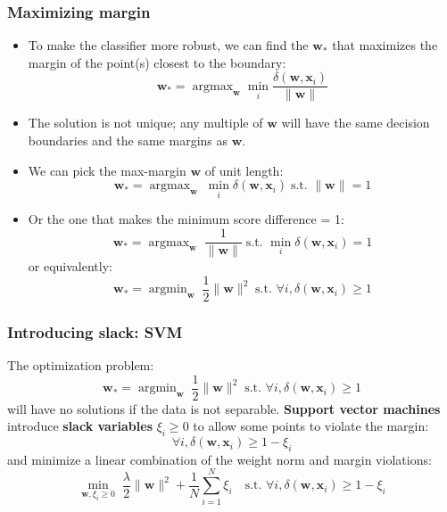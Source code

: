 \documentclass[ignorenonframetext,plain,fleqn]{beamer}
\DeclareMathOperator*{\argmax}{argmax}
\DeclareMathOperator*{\argmin}{argmin}
\renewcommand{\vec}{\mathbf}
\begin{document}
\begin{frame}\frametitle{Maximizing margin}
\begin{itemize}
\item To make the classifier more robust, we can find the $\vec{w}_*$
  that maximizes the margin of the point(s) closest to the boundary: 
\[
  \vec{w}_* = \argmax_\vec{w} \min_i \frac{\delta(\vec{w},\vec{x}_i)}{\|\vec{w}\|} 
\]
\item The solution is not unique; any multiple of $\vec{w}$ will have
  the same decision boundaries and the same margins as $\vec{w}$.
\item We can pick the max-margin $\vec{w}$ of unit length: \[
\vec{w}_* = \argmax_\vec{w}\; \min_i \delta(\vec{w},\vec{x}_i)
\;\text{s.t. } \|\vec{w}\|=1
\]
\item Or the one that makes the minimum score difference = 1: \[
\vec{w}_* = \argmax_\vec{w}\; \frac{1}{\|\vec{w}\|}
\;\text{s.t. } \min_i \delta(\vec{w},\vec{x}_i) = 1
\]
or equivalently: \[
\vec{w}_* = \argmin_\vec{w}\; \frac{1}{2} \|\vec{w}\|^2
\;\text{s.t. } \forall i, \delta(\vec{w},\vec{x}_i) \geq 1
\]
\end{itemize}
\end{frame}

\begin{frame}\frametitle{Introducing slack: SVM}
The optimization problem: 
\[
\vec{w}_* = \argmin_\vec{w}\; \frac{1}{2} \|\vec{w}\|^2
\;\text{s.t. } \forall i, \delta(\vec{w},\vec{x}_i) \geq 1
\]
will have no solutions if the data is not separable.  {\bf Support
  vector machines} introduce {\bf slack variables} $\xi_i \geq 0$ to
allow some points to violate the margin:
\[ 
\forall i, \delta(\vec{w},\vec{x}_i) \geq 1 - \xi_i
\]
and minimize a linear combination of the weight norm and margin
violations:
\[
\min_{\vec{w},\xi_i\geq 0}\; \frac{\lambda}{2} \|\vec{w}\|^2
+ \frac{1}{N} \sum_{i=1}^N \xi_i
\quad\text{s.t. }
\forall i, \delta(\vec{w},\vec{x}_i) \geq 1 - \xi_i
\]
\end{frame}
\end{document}
